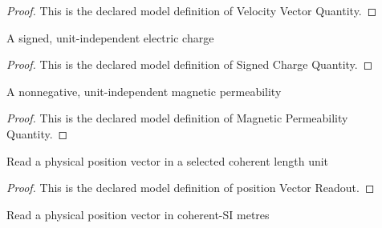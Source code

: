 \begin{proof}
  This is the declared model definition of Velocity Vector Quantity.
\end{proof}
\begin{definition}
  \label{def:physics:phyx-mini-0959:phyxminiproblems-problemphyxmini0959-signedchargequantity}
  A signed, unit-independent electric charge
\end{definition}
\begin{proof}
  This is the declared model definition of Signed Charge Quantity.
\end{proof}
\begin{definition}
  \label{def:physics:phyx-mini-0959:phyxminiproblems-problemphyxmini0959-magneticpermeabilityquantity}
  A nonnegative, unit-independent magnetic permeability
\end{definition}
\begin{proof}
  This is the declared model definition of Magnetic Permeability Quantity.
\end{proof}
\begin{definition}
  \label{def:physics:phyx-mini-0959:phyxminiproblems-problemphyxmini0959-positionvectorreadout}
  Read a physical position vector in a selected coherent length unit
\end{definition}
\begin{proof}
  This is the declared model definition of position Vector Readout.
\end{proof}
\begin{definition}
  \label{def:physics:phyx-mini-0959:phyxminiproblems-problemphyxmini0959-positionvectorinmeters}
  Read a physical position vector in coherent-SI metres
\end{definition}
